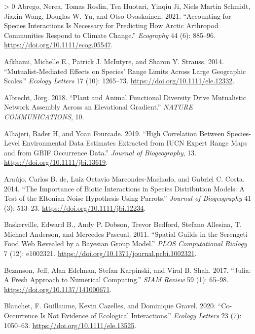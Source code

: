 \documentclass[10pt,oneside]{article}
\newlength{\cslhangindent}
\newenvironment{CSLReferences}[3] %
 {%
  \setlength{\parindent}{0pt}
  \ifodd #1 \everypar{\setlength{\hangindent}{\cslhangindent}}\ignorespaces\fi
  \ifnum #2 > 0
  \setlength{\parskip}{#2\baselineskip}
  \fi
 }%
 {}
\begin{document}
\hypertarget{refs}{}
\begin{CSLReferences}{1}{0}
\leavevmode\hypertarget{ref-Abrego2021AccSpe}{}%
Abrego, Nerea, Tomas Roslin, Tea Huotari, Yinqiu Ji, Niels Martin
Schmidt, Jiaxin Wang, Douglas W. Yu, and Otso Ovaskainen. 2021.
{``Accounting for Species Interactions Is Necessary for Predicting How
Arctic Arthropod Communities Respond to Climate Change.''}
\emph{Ecography} 44 (6): 885--96.
\url{https://doi.org/10.1111/ecog.05547}.

\leavevmode\hypertarget{ref-Afkhami2014MutEff}{}%
Afkhami, Michelle E., Patrick J. McIntyre, and Sharon Y. Strauss. 2014.
{``Mutualist-Mediated Effects on Species' Range Limits Across Large
Geographic Scales.''} \emph{Ecology Letters} 17 (10): 1265--73.
\url{https://doi.org/10.1111/ele.12332}.

\leavevmode\hypertarget{ref-Albrecht2018PlaAni}{}%
Albrecht, Jörg. 2018. {``Plant and Animal Functional Diversity Drive
Mutualistic Network Assembly Across an Elevational Gradient.''}
\emph{NATURE COMMUNICATIONS}, 10.

\leavevmode\hypertarget{ref-Alhajeri2019HigCor}{}%
Alhajeri, Bader H, and Yoan Fourcade. 2019. {``High Correlation Between
Species-Level Environmental Data Estimates Extracted from IUCN Expert
Range Maps and from GBIF Occurrence Data.''} \emph{Journal of
Biogeography}, 13. \url{https://doi.org/10.1111/jbi.13619}.

\leavevmode\hypertarget{ref-Araujo2014ImpBio}{}%
Araújo, Carlos B. de, Luiz Octavio Marcondes-Machado, and Gabriel C.
Costa. 2014. {``The Importance of Biotic Interactions in Species
Distribution Models: A Test of the Eltonian Noise Hypothesis Using
Parrots.''} \emph{Journal of Biogeography} 41 (3): 513--23.
\url{https://doi.org/10.1111/jbi.12234}.

\leavevmode\hypertarget{ref-Baskerville2011SpaGui}{}%
Baskerville, Edward B., Andy P. Dobson, Trevor Bedford, Stefano
Allesina, T. Michael Anderson, and Mercedes Pascual. 2011. {``Spatial
Guilds in the Serengeti Food Web Revealed by a Bayesian Group Model.''}
\emph{PLOS Computational Biology} 7 (12): e1002321.
\url{https://doi.org/10.1371/journal.pcbi.1002321}.

\leavevmode\hypertarget{ref-Bezanson2017JulFre}{}%
Bezanson, Jeff, Alan Edelman, Stefan Karpinski, and Viral B. Shah. 2017.
{``Julia: A Fresh Approach to Numerical Computing.''} \emph{SIAM Review}
59 (1): 65--98. \url{https://doi.org/10.1137/141000671}.

\leavevmode\hypertarget{ref-Blanchet2020CooNot}{}%
Blanchet, F. Guillaume, Kevin Cazelles, and Dominique Gravel. 2020.
{``Co-Occurrence Is Not Evidence of Ecological Interactions.''}
\emph{Ecology Letters} 23 (7): 1050--63.
\url{https://doi.org/10.1111/ele.13525}.


\end{CSLReferences}
\end{document}

